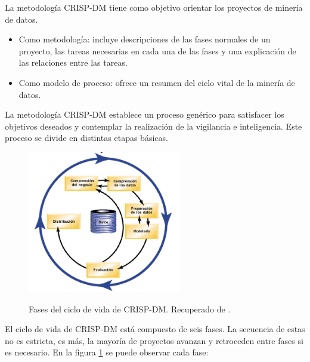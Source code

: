 La metodología CRISP-DM tiene como objetivo orientar los proyectos de minería de datos. 
\begin{itemize}
	\item Como metodología: incluye descripciones de las fases normales de un proyecto, las tareas necesarias en cada una de las fases y una explicación de las relaciones entre las tareas.
	\item Como modelo de proceso: ofrece un resumen del ciclo vital de la minería de datos.
\end{itemize}

La metodología CRISP-DM establece un proceso genérico para satisfacer los objetivos deseados y contemplar la realización de la vigilancia e inteligencia. Este proceso se divide en distintas etapas básicas. 

\begin{figure}[h]
\centering
\caption{Fases del ciclo de vida de CRISP-DM. Recuperado de \protect{}.}
 \includegraphics[width=0.6\textwidth]{recursos/CRISPCicloIBM}
\label{fig:CicloCrispDM}
\end{figure}
\FloatBarrier
El ciclo de vida de CRISP-DM está compuesto de seis fases. La secuencia de estas no es estricta, es más, la mayoría de proyectos avanzan y retroceden entre fases si es necesario. En la figura \ref{fig:CicloCrispDM} se puede observar cada fase:

